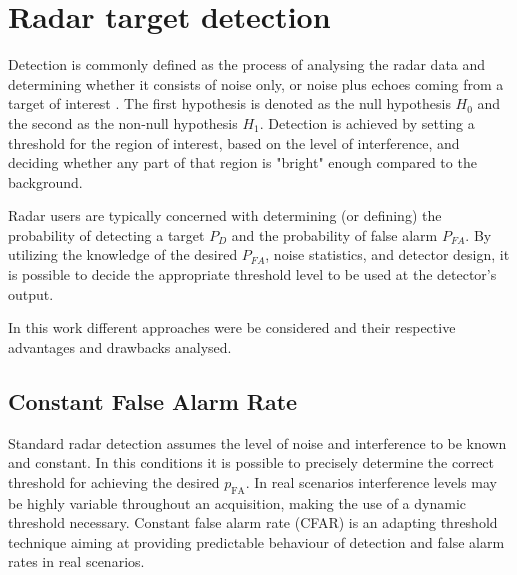 \chapter{Radar target detection}
\label{chap:radar_detection}

Detection is commonly defined as the process of analysing the radar data and determining whether it consists of noise only, or noise plus echoes coming from a target of interest \cite{Richards_Scheer_Holm_2010}. 
The first hypothesis is denoted as the null hypothesis $H_0$ and the second as the non-null hypothesis $H_1$.
Detection is achieved by setting a threshold for the region of interest, based on the level of interference, and deciding whether any part of that region is "bright" enough compared to the background.


Radar users are typically concerned with determining (or defining) the probability of detecting a target $P_D$ and the probability of false alarm $P_{FA}$.  By utilizing the knowledge of the desired $P_{FA}$, noise statistics, and detector design, it is possible to decide the appropriate threshold level to be used at the detector's output.





In this work different approaches were be considered and their respective advantages and drawbacks analysed. 



\section{Constant False Alarm Rate}
	
	Standard radar detection assumes the level of noise and interference to be known and constant. In this conditions it is possible to precisely determine the correct threshold for achieving the desired $	p_\text{FA}$. In real scenarios interference levels may be highly variable throughout an acquisition, making the use of a dynamic threshold necessary. Constant false alarm rate (CFAR) is an adapting threshold technique aiming at providing predictable behaviour of detection and false alarm rates in real scenarios.
	
	
